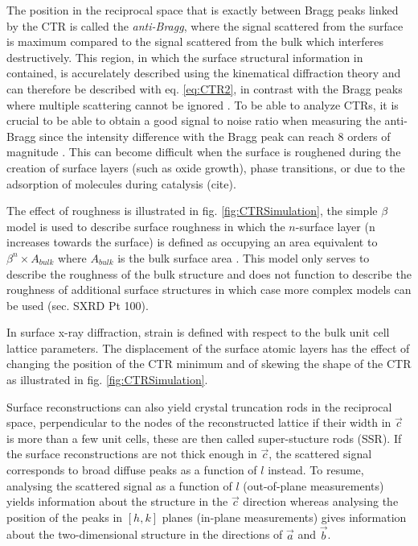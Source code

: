The position in the reciprocal space that is exactly between Bragg peaks linked by the CTR is called the \textit{anti-Bragg}, where the signal scattered from the surface is maximum compared to the signal scattered from the bulk which interferes destructively.
This region, in which the surface structural information in contained, is accurelately described using the kinematical diffraction theory and can therefore be described with eq. \ref{eq:CTR2}, in contrast with the Bragg peaks where multiple scattering cannot be ignored \parencite{Kaganer2007}.
To be able to analyze CTRs, it is crucial to be able to obtain a good signal to noise ratio when measuring the anti-Bragg since the intensity difference with the Bragg peak can reach 8 orders of magnitude \parencite{Fadenberger2010InSO}.
This can become difficult when the surface is roughened during the creation of surface layers (such as oxide growth), phase transitions, or due to the adsorption of molecules during catalysis (cite).

The effect of roughness is illustrated in fig. \ref{fig:CTRSimulation}, the simple $\beta$ model is used to describe surface roughness in which the $n$-surface layer (n increases towards the surface) is defined as occupying an area equivalent to $\beta^n \times A_{bulk}$ where $A_{bulk}$ is the bulk surface area \parencite{Robinson1986}.
This model only serves to describe the roughness of the bulk structure and does not function to describe the roughness of additional surface structures in which case more complex models can be used (sec. SXRD Pt 100).

In surface x-ray diffraction, strain is defined with respect to the bulk unit cell lattice parameters.
The displacement of the surface atomic layers has the effect of changing the position of the CTR minimum and of skewing the shape of the CTR as illustrated in fig. \ref{fig:CTRSimulation}.

Surface reconstructions can also yield crystal truncation rods in the reciprocal space, perpendicular to the nodes of the reconstructed lattice if their width in $\vec{c}$ is more than a few unit cells, these are then called super-stucture rods (SSR).
If the surface reconstructions are not thick enough in $\vec{c}$, the scattered signal corresponds to broad diffuse peaks as a function of $l$ instead.
To resume, analysing the scattered signal as a function of $l$ (out-of-plane measurements) yields information about the structure in the $\vec{c}$ direction whereas analysing the position of the peaks in $[h, k]$ planes (in-plane measurements) gives information about the two-dimensional structure in the directions of $\vec{a}$ and $\vec{b}$.

